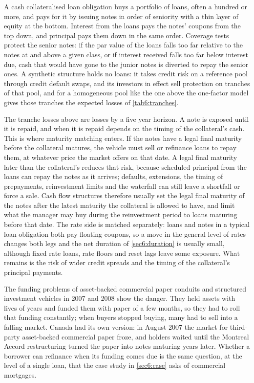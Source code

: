 \begin{chapterrefs}
A cash collateralised loan obligation buys a portfolio of loans, often a hundred or more, and pays for
it by issuing notes in order of seniority with a thin layer of equity at the bottom. Interest from
the loans pays the notes' coupons from the top down, and principal pays them down in the same order.
Coverage tests protect the senior notes: if the par value of the loans falls too far relative to the
notes at and above a given class, or if interest received falls too far below interest due, cash that
would have gone to the junior notes is diverted to repay the senior ones. A synthetic structure
holds no loans: it takes credit risk on a reference pool through credit default swaps, and its
investors in effect sell protection on tranches of that pool, and for a homogeneous pool like the one
above the one-factor model gives those tranches the expected losses of \cref{tab6:tranches}.

The tranche losses above are losses by a five year horizon. A note is exposed until it is repaid, and
when it is repaid depends on the timing of the collateral's cash. This is where maturity matching
enters. If the notes have a legal final maturity before the collateral matures, the vehicle must sell
or refinance loans to repay them, at whatever price the market offers on that date. A legal final maturity later than the collateral's reduces that risk, because scheduled principal from
the loans can repay the notes as it arrives; defaults, extensions, the timing of prepayments,
reinvestment limits and the waterfall can still leave a shortfall or force a sale. Cash flow
structures therefore usually set the legal final maturity of the notes after the latest maturity
the collateral is allowed to have, and limit what the manager may buy during the reinvestment period to loans maturing before that date.
The rate side is matched separately: loans and notes in a typical loan obligation both pay floating
coupons, so a move in the general level of rates changes both legs and the net duration of \cref{sec6:duration} is usually small, although fixed rate
loans, rate floors and reset lags leave some exposure. What remains is the risk of wider credit spreads and the timing of the collateral's principal
payments.

The funding problems of asset-backed commercial paper conduits and structured investment vehicles in
2007 and 2008 show the danger. They held assets with lives of years and funded them with paper of a
few months, so they had to roll that funding constantly; when buyers stopped buying, many had to sell
into a falling market. Canada had its own version: in August 2007 the market for third-party
asset-backed commercial paper froze, and holders waited until the Montreal Accord restructuring
turned the paper into notes maturing years later. Whether a borrower can refinance when its funding
comes due is the same question, at the level of a single loan, that the case study in
\cref{sec6:case} asks of commercial mortgages.


\end{chapterrefs}
